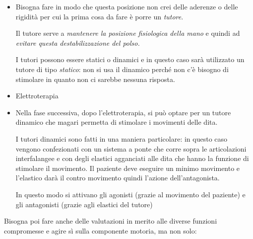 \begin{itemize}
\item
  Bisogna fare in modo che questa posizione non crei delle aderenze o
  delle rigidità per cui la prima cosa da fare è porre un \emph{tutore}.

Il tutore serve a \emph{mantenere la posizione fisiologica della mano} e
quindi ad \emph{evitare questa destabilizzazione del polso.}

I tutori possono essere statici o dinamici e in questo caso sarà
utilizzato un tutore di tipo \emph{statico}: non si usa il dinamico
perché non c'è bisogno di stimolare in quanto non ci sarebbe nessuna
risposta.

\item
  Elettroterapia
\item
  Nella fase successiva, dopo l'elettroterapia, si può optare per un
  tutore dinamico che magari permetta di stimolare i movimenti delle
  dita.

I tutori dinamici sono fatti in una maniera particolare: in questo caso
vengono confezionati con un sistema a ponte che corre sopra le
articolazioni interfalangee e con degli elastici agganciati alle dita
che hanno la funzione di stimolare il movimento. Il paziente deve
eseguire un minimo movimento e l'elastico darà il contro movimento
quindi l'azione dell'antagonista.

In questo modo si attivano gli agonisti (grazie al movimento del
paziente) e gli antagonisti (grazie agli elastici del tutore)
\end{itemize}

Bisogna poi fare anche delle valutazioni in merito alle diverse funzioni
compromesse e agire sì sulla componente motoria, ma non solo:

